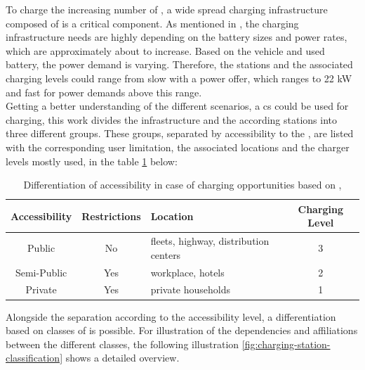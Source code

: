 To charge the increasing number of , a wide spread charging infrastructure composed of  is a critical component. As mentioned in \cite{gnann_fast_2018}, the charging infrastructure needs are highly depending on the battery sizes and power rates, which are approximately about to increase.
Based on the vehicle and used battery, the power demand is varying. Therefore, the stations and the associated charging levels could range from slow  with a power offer, which ranges to 22 \acrshort{kW} and fast  for power demands above this range. \\
\noindent Getting a better understanding of the different scenarios, a \acrshort{cs} could be used for charging, this work divides the infrastructure and the according stations into three different groups. These groups, separated by accessibility to the , are listed with the corresponding user limitation, the associated locations and the charger levels mostly used, in the table \ref{tab:cs-accessibility-levels} below:

\begingroup
\setlength{\tabcolsep}{10pt} %
\renewcommand{\arraystretch}{1.5} %
\begin{table}[!ht]
\centering
\caption{Differentiation of accessibility in case of charging opportunities based on \cite{kathiresh_e-mobility_2022},\cite[18-19]{linnemann_elektromobilitat_2020}}
    \begin{tabular}{c|c|m{5.5cm}|c}
    Accessibility & Restrictions & Location & Charging Level \\ \hline
    Public & No & fleets, highway, distribution centers & 3 \\
    Semi-Public & Yes & workplace, hotels & 2 \\
    Private & Yes & private households & 1 
    \end{tabular}
\label{tab:cs-accessibility-levels}
\end{table}
\endgroup

\noindent Alongside the separation according to the accessibility level, a differentiation based on classes of  is possible. For illustration of the dependencies and affiliations between the different classes, the following illustration \ref{fig:charging-station-classification} shows a detailed overview. 

